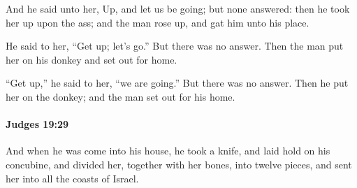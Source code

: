 			\begin{versebox}
					\item[BHS] 
					\item[ASV] And he said unto her, Up, and let us be going; but none answered: then he took her up upon the ass; and the man rose up, and gat him unto his place.
					\item[NIV] He said to her, “Get up; let’s go.” But there was no answer. Then the man put her on his donkey and set out for home.
					\item[NRSV] “Get up,” he said to her, “we are going.” But there was no answer. Then he put her on the donkey; and the man set out for his home.
			\end{versebox}

		\paragraph{Judges 19:29} %
			\label{JUDGES-19-29}

			And when he was come into his house, he took a knife, and laid hold on his concubine, and divided her, together with her bones, into twelve pieces, and sent her into all the coasts of Israel.

